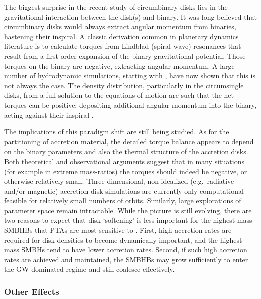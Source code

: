 \documentclass[onecolumn,authoryear]{els-mrw}
\begin{document}
The biggest surprise in the recent study of circumbinary disks lies in the gravitational interaction between the disk(s) and binary.  It was long believed that circumbinary disks would always extract angular momentum from binaries, hastening their inspiral.  A classic derivation common in planetary dynamics literature is to calculate torques from Lindblad (spiral wave) resonances that result from a first-order expansion of the binary gravitational potential.  Those torques on the binary are negative, extracting angular momentum.  A large number of hydrodynamic simulations, starting with \citet{Miranda+2017}, have now shown that this is not always the case.  The density distribution, particularly in the circumsingle disks, from a full solution to the equations of motion are such that the net torques can be positive: depositing additional angular momentum into the binary, acting against their inspiral \citep{Muñoz+2019}.

The implications of this paradigm shift are still being studied.  As for the partitioning of accretion material, the detailed torque balance appears to depend on the binary parameters and also the thermal structure of the accretion disks.  Both theoretical and observational arguments suggest that in many situations (for example in extreme mass-ratios) the torques should indeed be negative, or otherwise relatively small.  Three-dimensional, non-idealized (e.g.~radiative and/or magnetic) accretion disk simulations are currently only computational feasible for relatively small numbers of orbits.  Similarly, large explorations of parameter space remain intractable.  While the picture is still evolving, there are two reasons to expect that disk `softening' is less important for the highest-mass SMBHBs that PTAs are most sensitive to \citep{Bortolas+2021}.  First, high accretion rates are required for disk densities to become dynamically important, and the highest-mass SMBHs tend to have lower accretion rates.  Second, if such high accretion rates are achieved and maintained, the SMBHBs may grow sufficiently to enter the GW-dominated regime and still coalesce effectively.

\subsubsection{Other Effects}\label{sec:binary_evolution_other}
\end{document}
